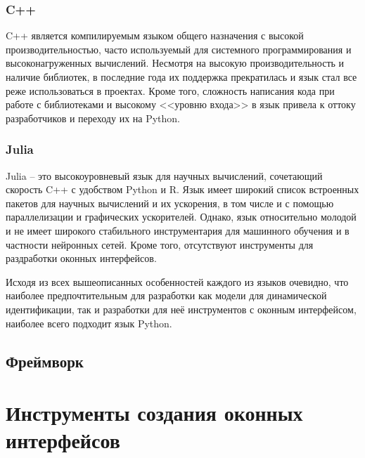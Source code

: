 \subsubsection{C++} 
C++ является компилируемым языком общего назначения с высокой производительностью,
часто используемый для системного программирования и высоконагруженных
вычислений. Несмотря на высокую производительность и наличие библиотек, в
последние года их поддержка прекратилась и язык стал все реже использоваться в
проектах. Кроме того, сложность написания кода при работе с библиотеками и
высокому <<уровню входа>> в язык привела к оттоку разработчиков и переходу их
на Python.

\subsubsection{Julia} 
Julia – это высокоуровневый язык для научных вычислений, сочетающий скорость C++ с удобством Python и R. Язык имеет широкий список встроенных пакетов для научных вычислений и их ускорения, в том числе и с помощью параллелизации и графических ускорителей. Однако, язык относительно молодой и не имеет широкого стабильного инструментария для машинного обучения и в частности нейронных сетей. Кроме того, отсутствуют инструменты для раздработки оконных интерфейсов. 

Исходя из всех вышеописанных особенностей каждого из языков очевидно, что наиболее предпочтительным для разработки как модели для динамической идентификации, так и разработки для неё инструментов с оконным интерфейсом, наиболее всего подходит язык Python.

\subsection{Фреймворк}

\section{Инструменты создания оконных интерфейсов}
